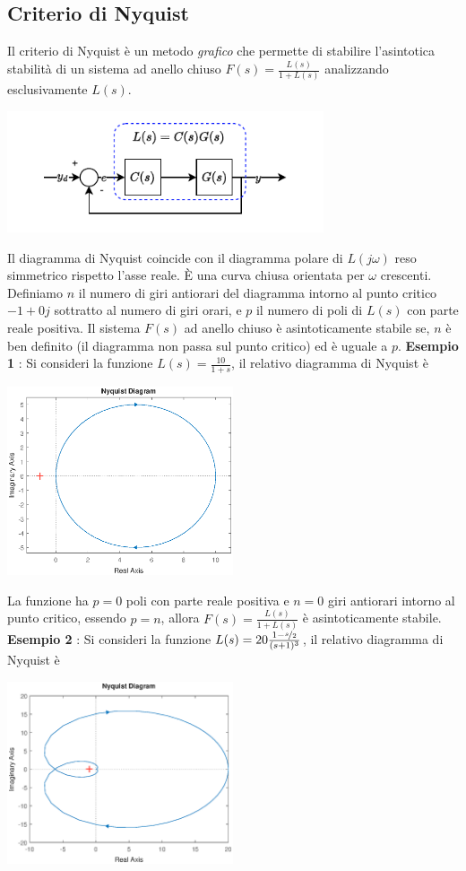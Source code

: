 \documentclass[10pt, letterpaper]{report}
\begin{document}
\subsection{Criterio di Nyquist}
Il criterio di Nyquist è un metodo \textit{grafico} che permette di stabilire l'asintotica stabilità di un sistema ad anello chiuso $F(s)=\frac{L(s)}{1+L(s)}$ analizzando esclusivamente $L(s)$.\begin{center}
    \includegraphics[width=0.7\textwidth ]{images/ls.pdf}
 \end{center}
Il diagramma di Nyquist coincide con il diagramma polare di $L(j\omega)$ reso simmetrico rispetto l'asse reale. È una curva chiusa orientata per $\omega$ crescenti. Definiamo $n$ il numero di giri antiorari del diagramma intorno al punto critico $-1+0j$ sottratto al numero di giri orari, e $p$ il numero di poli di $L(s)$ con parte reale positiva. Il sistema $F(s)$ ad anello chiuso è asintoticamente stabile se, $n$ è ben definito (il diagramma non passa sul punto critico) ed è uguale a $p$.\acc
\textbf{Esempio 1 } : Si consideri la funzione $L(s)=\frac{10}{1+s}$, il relativo diagramma di Nyquist è 
\begin{center}
    \includegraphics[width=0.5\textwidth ]{images/nyquist1.eps}
 \end{center}
La funzione ha $p=0$ poli con parte reale positiva e $n=0$ giri antiorari intorno al punto critico, essendo $p=n$, allora $F(s)=\frac{L(s)}{1+L(s)}$ è asintoticamente stabile.\acc
\textbf{Esempio 2} : Si consideri la funzione $L(s)=20\frac{1-\nicefrac{s}{2}}{(s+1)^3}$, il relativo diagramma di Nyquist è 
\begin{center}
    \includegraphics[width=0.5\textwidth ]{images/nyquist2.eps}
 \end{center}
\end{document}
